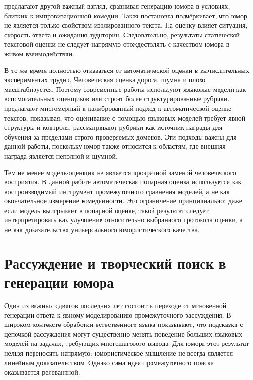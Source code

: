 \citet{winters2025evaluating} предлагают другой важный взгляд, сравнивая генерацию юмора в условиях, близких к импровизационной комедии. Такая постановка подчёркивает, что юмор не является только свойством изолированного текста. На оценку влияет ситуация, скорость ответа и ожидания аудитории. Следовательно, результаты статической текстовой оценки не следует напрямую отождествлять с качеством юмора в живом взаимодействии.

В то же время полностью отказаться от автоматической оценки в вычислительных экспериментах трудно. Человеческая оценка дорога, шумна и плохо масштабируется. Поэтому современные работы используют языковые модели как вспомогательных оценщиков или строят более структурированные рубрики. \citet{Hashemi2024} предлагают многомерный и калиброванный подход к автоматической оценке текстов, показывая, что оценивание с помощью языковых моделей требует явной структуры и контроля. \citet{Gunjal2025} рассматривают рубрики как источник награды для обучения за пределами строго проверяемых доменов. Эти подходы важны для данной работы, поскольку юмор также относится к областям, где внешняя награда является неполной и шумной.

Тем не менее модель-оценщик не является прозрачной заменой человеческого восприятия. В данной работе автоматическая попарная оценка используется как воспроизводимый инструмент промежуточного сравнения моделей, а не как окончательное измерение комедийности. Это ограничение принципиально: даже если модель выигрывает в попарной оценке, такой результат следует интерпретировать как улучшение относительно выбранного протокола оценки, а не как доказательство универсального юмористического качества.

\section{Рассуждение и творческий поиск в генерации юмора}

Один из важных сдвигов последних лет состоит в переходе от мгновенной генерации ответа к явному моделированию промежуточного рассуждения. В широком контексте обработки естественного языка \citet{Wei2022} показывают, что подсказки с цепочкой рассуждения могут существенно менять поведение больших языковых моделей на задачах, требующих многошагового вывода. Для юмора этот результат нельзя переносить напрямую: юмористическое мышление не всегда является линейным доказательством. Однако сама идея промежуточного поиска оказывается релевантной.


